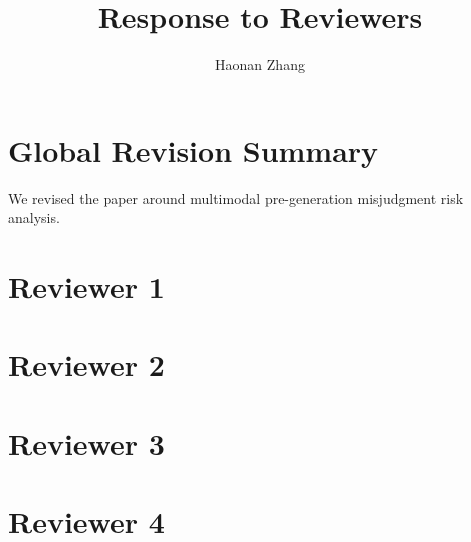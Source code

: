 \documentclass[11pt]{article}
\title{Response to Reviewers}
\author{Haonan Zhang}
\begin{document}
\maketitle

\section*{Global Revision Summary}

We revised the paper around multimodal pre-generation misjudgment risk analysis.

\section*{Reviewer 1}

\section*{Reviewer 2}

\section*{Reviewer 3}

\section*{Reviewer 4}
\end{document}
